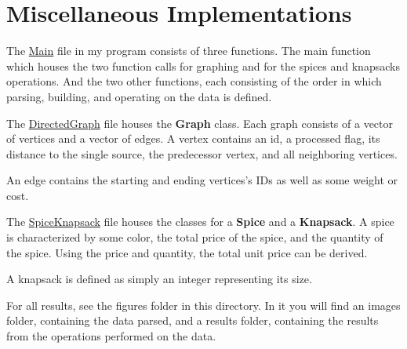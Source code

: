 \documentclass[12pt, letterpaper]{article}
\begin{document}
\section{Miscellaneous Implementations} \label{MiscImp}
The \underline{Main} file in my program consists of three functions.
The main function which houses the two function calls for graphing and for the spices and knapsacks operations.
And the two other functions, each consisting of the order in which parsing, building, and operating on the data is defined.
\begin{center}
   
\end{center}
The \underline{DirectedGraph} file houses the \textbf{Graph} class.
Each graph consists of a vector of vertices and a vector of edges.
A vertex contains an id, a processed flag, its distance to the single source, the predecessor vertex, and all neighboring vertices.
\begin{center}
   
\end{center}
An edge contains the starting and ending vertices's IDs as well as some weight or cost.
\begin{center}
   
\end{center}
The \underline{SpiceKnapsack} file houses the classes for a \textbf{Spice} and a \textbf{Knapsack}.
A spice is characterized by some color, the total price of the spice, and the quantity of the spice.
Using the price and quantity, the total unit price can be derived.
\begin{center}
   
\end{center}
A knapsack is defined as simply an integer representing its size.
\begin{center}
   
\end{center}
For all results, see the figures folder in this directory.
In it you will find an images folder, containing the data parsed, and a results folder, containing the results from the operations performed on the data.
\end{document}
